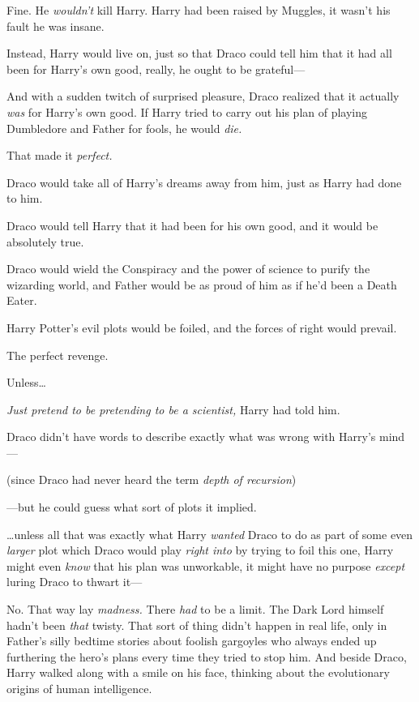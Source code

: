 Fine. He \emph{wouldn't} kill Harry. Harry had been raised by Muggles, it
wasn't his fault he was insane.

Instead, Harry would live on, just so that Draco could tell him that it had all
been for Harry's own good, really, he ought to be grateful---

And with a sudden twitch of surprised pleasure, Draco realized that it actually
\emph{was} for Harry's own good. If Harry tried to carry out his plan of
playing Dumbledore and Father for fools, he would \emph{die.}

That made it \emph{perfect.}

Draco would take all of Harry's dreams away from him, just as Harry had done to
him.

Draco would tell Harry that it had been for his own good, and it would be
absolutely true.

Draco would wield the Conspiracy and the power of science to purify the
wizarding world, and Father would be as proud of him as if he'd been a Death
Eater.

Harry Potter's evil plots would be foiled, and the forces of right would
prevail.

The perfect revenge.

Unless{\ldots}

\emph{Just pretend to be pretending to be a scientist,} Harry had told him.

Draco didn't have words to describe exactly what was wrong with Harry's mind---

(since Draco had never heard the term \emph{depth of recursion})

---but he could guess what sort of plots it implied.

{\ldots}unless all that was exactly what Harry \emph{wanted} Draco to do as
part of some even \emph{larger} plot which Draco would play \emph{right into}
by trying to foil this one, Harry might even \emph{know} that his plan was
unworkable, it might have no purpose \emph{except} luring Draco to thwart it---

No. That way lay \emph{madness.} There \emph{had} to be a limit. The Dark Lord
himself hadn't been \emph{that} twisty. That sort of thing didn't happen in
real life, only in Father's silly bedtime stories about foolish gargoyles who
always ended up furthering the hero's plans every time they tried to stop him.
\sbreak
And beside Draco, Harry walked along with a smile on his face, thinking about
the evolutionary origins of human intelligence.

